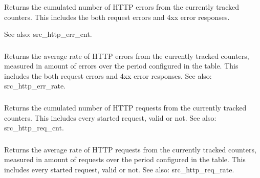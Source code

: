\subsubsection[sc1\_http\_err\_cnt]{}
\subsubsection[sc2\_http\_err\_cnt]{}
  Returns the cumulated number of HTTP errors from the currently tracked
  counters. This includes the both request errors and 4xx error responses.

See also: src\_http\_err\_cnt.

\subsubsection[sc1\_http\_err\_rate]{}
\subsubsection[sc2\_http\_err\_rate]{}
  Returns the average rate of HTTP errors from the currently tracked counters,
  measured in amount of errors over the period configured in the table. This
  includes the both request errors and 4xx error responses.
See also:   src\_http\_err\_rate.

\subsubsection[sc1\_http\_req\_cnt]{}
\subsubsection[sc2\_http\_req\_cnt]{}
  Returns the cumulated number of HTTP requests from the currently tracked
  counters. This includes every started request, valid or not.
See also:   src\_http\_req\_cnt.

\subsubsection[sc1\_http\_req\_rate]{}
\subsubsection[sc2\_http\_req\_rate]{}
  Returns the average rate of HTTP requests from the currently tracked
  counters, measured in amount of requests over the period configured in
  the table. This includes every started request, valid or not.
See also:   src\_http\_req\_rate.

